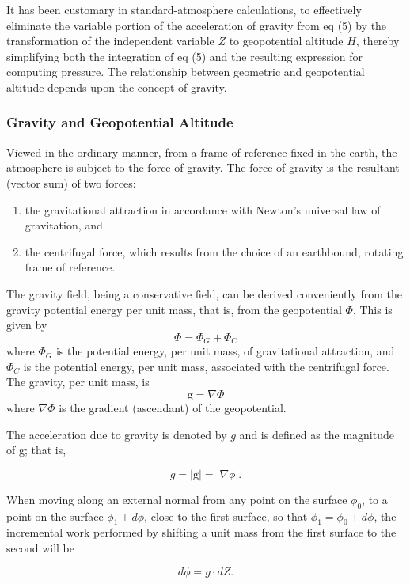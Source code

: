 \documentclass{article}
\begin{document}
It has been customary in standard-atmosphere calculations, to effectively eliminate the variable portion of the acceleration of gravity from eq (5) by the transformation of the independent variable $Z$ to geopotential altitude $H$, thereby simplifying both the integration of eq (5) and the resulting expression for computing pressure. The relationship between geometric and geopotential altitude depends upon the concept of gravity.

\subsubsection{Gravity and Geopotential Altitude}

Viewed in the ordinary manner, from a frame of reference fixed in the earth, the atmosphere is subject to the force of gravity. The force of gravity is the resultant (vector sum) of two forces:
\begin{enumerate}
    \item the gravitational attraction in accordance with Newton's universal law of gravitation, and
    \item the centrifugal force, which results from the choice of an earthbound, rotating frame of reference.
\end{enumerate}

The gravity field, being a conservative field, can be derived conveniently from the gravity potential energy per unit mass, that is, from the geopotential $\Phi$. This is given by
\[
\Phi = \Phi_G + \Phi_C \tag{10}
\]
where $\Phi_G$ is the potential energy, per unit mass, of gravitational attraction, and $\Phi_C$ is the potential energy, per unit mass, associated with the centrifugal force. The gravity, per unit mass, is
\[
 \text{g} = \nabla \Phi \tag{11}
\]
where $\nabla \Phi$ is the gradient (ascendant) of the geopotential.

The acceleration due to gravity is denoted by $g$ and is defined as the magnitude of g; that is,

\begin{equation}
 g = |\text{g}| = |\nabla \phi|. \tag{12}
\end{equation}

When moving along an external normal from any point on the surface $\phi_0$, to a point on the surface $\phi_1+d\phi$, close to the first surface, so that $\phi_1 = \phi_0 + d\phi$, the incremental work performed by shifting a unit mass from the first surface to the second will be

\begin{equation}
 d\phi = g \cdot dZ. \tag{13}
\end{equation}
\end{document}
